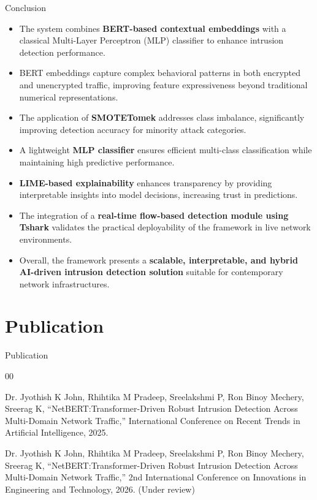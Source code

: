 \documentclass[aspectratio=169,xcolor=dvipsnames]{beamer}
\begin{document}
\begin{frame}{Conclusion}
\begin{itemize}

    \item The system combines \textbf{BERT-based contextual embeddings} with a classical Multi-Layer Perceptron (MLP) classifier to enhance intrusion detection performance.

    \item BERT embeddings capture complex behavioral patterns in both encrypted and unencrypted traffic, improving feature expressiveness beyond traditional numerical representations.

    \item The application of \textbf{SMOTETomek} addresses class imbalance, significantly improving detection accuracy for minority attack categories.

    \item A lightweight \textbf{MLP classifier} ensures efficient multi-class classification while maintaining high predictive performance.

    \item \textbf{LIME-based explainability} enhances transparency by providing interpretable insights into model decisions, increasing trust in predictions.

    \item The integration of a \textbf{real-time flow-based detection module using Tshark} validates the practical deployability of the framework in live network environments.

    \item Overall, the framework presents a \textbf{scalable, interpretable, and hybrid AI-driven intrusion detection solution} suitable for contemporary network infrastructures.

\end{itemize}

\end{frame}

\section{Publication}
\begin{frame}{Publication}

\begin{thebibliography}{00}

\bibitem{}
Dr. Jyothish K John, Rhihtika M Pradeep, Sreelakshmi P, Ron Binoy Mechery, Sreerag K, 
``NetBERT:Transformer-Driven Robust Intrusion Detection Across Multi-Domain
Network Traffic,'' 
International Conference on Recent Trends in Artificial Intelligence, 2025.

\bibitem{}
Dr. Jyothish K John, Rhihtika M Pradeep, Sreelakshmi P, Ron Binoy Mechery, Sreerag K, 
``NetBERT:Transformer-Driven Robust Intrusion Detection Across Multi-Domain
Network Traffic,'' 
2nd International Conference on Innovations in Engineering and Technology, 2026. (Under review)

\end{thebibliography}

\end{frame}
\end{document}
